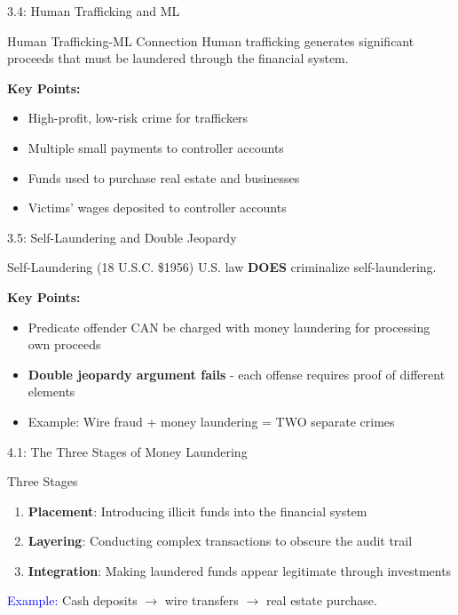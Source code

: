 \documentclass{beamer}
\begin{document}
	\begin{frame}{3.4: Human Trafficking and ML}
		\begin{block}{Human Trafficking-ML Connection}
			Human trafficking generates significant proceeds that must be laundered through the financial system.
		\end{block}
		\textbf{Key Points:}
		\begin{itemize}
			\item High-profit, low-risk crime for traffickers
			\item Multiple small payments to controller accounts
			\item Funds used to purchase real estate and businesses
			\item Victims' wages deposited to controller accounts
		\end{itemize}
	\end{frame}
	
	\begin{frame}{3.5: Self-Laundering and Double Jeopardy}
		\begin{block}{Self-Laundering (18 U.S.C. \$1956)}
			U.S. law \textbf{DOES} criminalize self-laundering.
		\end{block}
		\textbf{Key Points:}
		\begin{itemize}
			\item Predicate offender CAN be charged with money laundering for processing own proceeds
			\item \textbf{Double jeopardy argument fails} - each offense requires proof of different elements
			\item Example: Wire fraud + money laundering = TWO separate crimes
		\end{itemize}
	\end{frame}
	
	
	\begin{frame}{4.1: The Three Stages of Money Laundering}
		\begin{block}{Three Stages}
			\begin{enumerate}
				\item \textbf{Placement}: Introducing illicit funds into the financial system
				\item \textbf{Layering}: Conducting complex transactions to obscure the audit trail
				\item \textbf{Integration}: Making laundered funds appear legitimate through investments
			\end{enumerate}
		\end{block}
		\textcolor{blue}{Example:} Cash deposits $\rightarrow$ wire transfers $\rightarrow$ real estate purchase.
	\end{frame}
	
\end{document}
